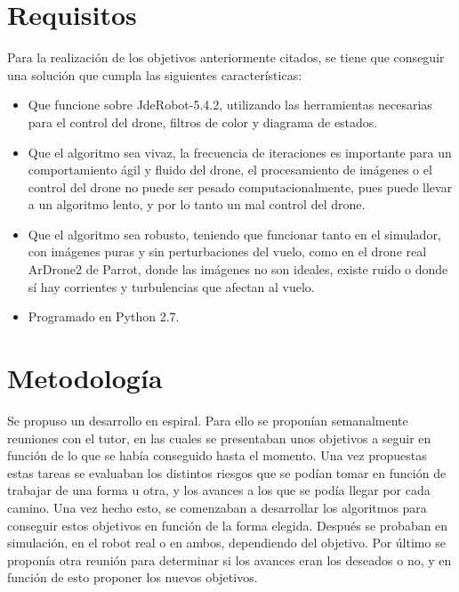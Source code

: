 \section{Requisitos}
\hspace{1 cm} Para la realizaci\'on de los objetivos anteriormente citados, se tiene que conseguir una soluci\'on que cumpla las siguientes caracter\'isticas:
\begin{itemize}
\item  Que funcione sobre JdeRobot-5.4.2, utilizando las herramientas necesarias para el control del drone, filtros de color y diagrama de estados. 
\item  Que el algoritmo sea vivaz, la frecuencia de iteraciones es importante para un comportamiento \'agil y fluido del drone, el procesamiento de im\'agenes o el control del drone no puede ser pesado computacionalmente, pues puede llevar a un algoritmo lento, y por lo tanto un mal control del drone. 
\item  Que el algoritmo sea robusto, teniendo que funcionar tanto en el simulador, con im\'agenes puras y sin perturbaciones del vuelo, como en el drone real ArDrone2 de Parrot, donde las im\'agenes no son ideales, existe ruido o donde s\'i hay corrientes y turbulencias que afectan al vuelo.
\item  Programado en Python 2.7. 
\end{itemize}

\section{Metodolog\'ia}

\hspace{1 cm}Se propuso un desarrollo en espiral. Para ello se propon\'ian semanalmente reuniones con el tutor, en las cuales se presentaban unos objetivos a seguir en funci\'on de lo que se hab\'ia conseguido hasta el momento. Una vez propuestas estas tareas se evaluaban los distintos riesgos que se pod\'ian tomar en funci\'on de trabajar de una forma u otra, y los avances a los que se pod\'ia llegar por cada camino. Una vez hecho esto, se comenzaban a desarrollar los algoritmos para conseguir estos objetivos en funci\'on de la forma elegida. Despu\'es se probaban en simulaci\'on, en el robot real o en ambos, dependiendo del objetivo. Por \'ultimo se propon\'ia otra reuni\'on para determinar si los avances eran los deseados o no, y en funci\'on de esto proponer los nuevos objetivos.


